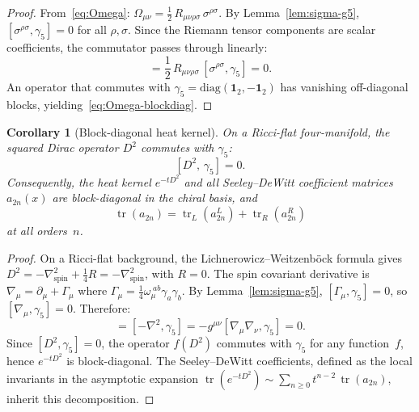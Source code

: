 \documentclass[12pt,a4paper]{article}
\newtheorem{corollary}[theorem]{Corollary}
\theoremstyle{definition}
\theoremstyle{remark}
\newcommand{\tr}{\operatorname{tr}}
\begin{document}
\begin{proof}
From~\eqref{eq:Omega}: $\Omega_{\mu\nu} = \frac{1}{2}\,R_{\mu\nu\rho\sigma}\,
\sigma^{\rho\sigma}$.  By Lemma~\ref{lem:sigma-g5},
$[\sigma^{\rho\sigma}, \gamma_5] = 0$ for all $\rho, \sigma$.  Since the
Riemann tensor components are scalar coefficients, the commutator passes
through linearly:
\begin{equation}
  [\Omega_{\mu\nu}, \gamma_5]
  = \frac{1}{2}\,R_{\mu\nu\rho\sigma}\,[\sigma^{\rho\sigma}, \gamma_5]
  = 0.
\end{equation}
An operator that commutes with $\gamma_5 = \mathrm{diag}(\mathbf{1}_2, -\mathbf{1}_2)$
has vanishing off-diagonal blocks, yielding~\eqref{eq:Omega-blockdiag}.
\end{proof}

\begin{corollary}[Block-diagonal heat kernel]
\label{cor:heat}
On a Ricci-flat four-manifold, the squared Dirac operator $D^2$ commutes
with $\gamma_5$:
\begin{equation}\label{eq:D2-g5}
  [D^2,\, \gamma_5] = 0.
\end{equation}
Consequently, the heat kernel $e^{-tD^2}$ and all Seeley--DeWitt coefficient
matrices $a_{2n}(x)$ are block-diagonal in the chiral basis, and
\begin{equation}\label{eq:tr-decompose}
  \tr(a_{2n}) = \tr_L(a_{2n}^L) + \tr_R(a_{2n}^R)
\end{equation}
at all orders~$n$.
\end{corollary}

\begin{proof}
On a Ricci-flat background, the Lichnerowicz--Weitzenb\"ock formula gives
$D^2 = -\nabla^2_{\mathrm{spin}} + \frac{1}{4}R = -\nabla^2_{\mathrm{spin}}$,
with $R = 0$.  The spin covariant derivative is
$\nabla_\mu = \partial_\mu + \Gamma_\mu$ where
$\Gamma_\mu = \frac{1}{4}\omega_\mu^{\;ab}\gamma_a\gamma_b$.
By Lemma~\ref{lem:sigma-g5}, $[\Gamma_\mu, \gamma_5] = 0$, so
$[\nabla_\mu, \gamma_5] = 0$.  Therefore:
\begin{equation}
  [D^2, \gamma_5] = [-\nabla^2, \gamma_5]
  = -g^{\mu\nu}[\nabla_\mu\nabla_\nu, \gamma_5] = 0.
\end{equation}
Since $[D^2, \gamma_5] = 0$, the operator $f(D^2)$ commutes with $\gamma_5$
for any function~$f$, hence $e^{-tD^2}$ is block-diagonal.  The
Seeley--DeWitt coefficients, defined as the local invariants in the
asymptotic expansion $\tr(e^{-tD^2}) \sim \sum_{n \geq 0} t^{n-2}\,\tr(a_{2n})$,
inherit this decomposition.
\end{proof}
\end{document}
